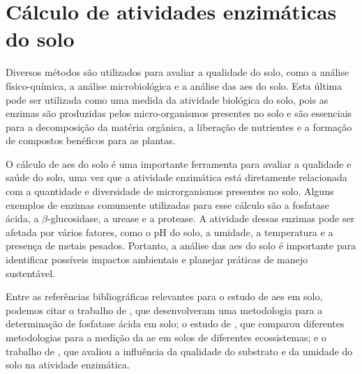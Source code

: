 \section{Cálculo de atividades enzimáticas do solo}\label{sec:calculo_enzimatico}
Diversos métodos são utilizados para avaliar a qualidade do solo, como a análise físico-química, a análise microbiológica e a análise das \acp{ae} do solo. Esta última pode ser utilizada como uma medida da atividade biológica do solo, pois as enzimas são produzidas pelos micro-organismos presentes no solo e são essenciais para a decomposição da matéria orgânica, a liberação de nutrientes e a formação de compostos benéficos para as plantas.

O cálculo de \acp{ae} do solo é uma importante ferramenta para avaliar a qualidade e saúde do solo, uma vez que a atividade enzimática está diretamente relacionada com a quantidade e diversidade de microrganismos presentes no solo. Alguns exemplos de enzimas comumente utilizadas para esse cálculo são a fosfatase ácida, a $\beta$-glucosidase, a urease e a protease. A atividade dessas enzimas pode ser afetada por vários fatores, como o pH do solo, a umidade, a temperatura e a presença de metais pesados. Portanto, a análise das \acp{ae} do solo é importante para identificar possíveis impactos ambientais e planejar práticas de manejo sustentável.


Entre as referências bibliográficas relevantes para o estudo de \acp{ae} em solo, podemos citar o trabalho de \citet{tabatabai1969use}, que desenvolveram uma metodologia para a determinação de fosfatase ácida em solo; o estudo de \citet{allison2010measurement}, que comparou diferentes metodologias para a medição da \ac{ae} em solos de diferentes ecossistemas; e o trabalho de \citet{sinsabaugh2008stoichiometry}, que avaliou a influência da qualidade do substrato e da umidade do solo na atividade enzimática.

